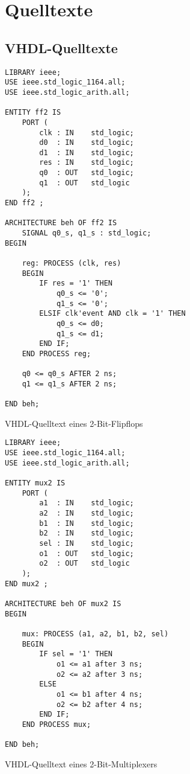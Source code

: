 \chapter{Quelltexte}

\section{VHDL-Quelltexte}\label{anhang:source:vhdl}

\begin{code}
    \begin{verbatim}
LIBRARY ieee;
USE ieee.std_logic_1164.all;
USE ieee.std_logic_arith.all;

ENTITY ff2 IS
    PORT (
        clk : IN    std_logic;
        d0  : IN    std_logic;
        d1  : IN    std_logic;
        res : IN    std_logic;
        q0  : OUT   std_logic;
        q1  : OUT   std_logic
    );
END ff2 ;

ARCHITECTURE beh OF ff2 IS
    SIGNAL q0_s, q1_s : std_logic;
BEGIN
    
    reg: PROCESS (clk, res)
    BEGIN
        IF res = '1' THEN
            q0_s <= '0';
            q1_s <= '0';
        ELSIF clk'event AND clk = '1' THEN
            q0_s <= d0;
            q1_s <= d1;
        END IF;
    END PROCESS reg;

    q0 <= q0_s AFTER 2 ns;
    q1 <= q1_s AFTER 2 ns;

END beh;
    \end{verbatim}
    \caption{VHDL-Quelltext eines 2-Bit-Flipflops \cite[siehe][39]{kesel2013}}
\end{code}

\begin{code}
    \begin{verbatim}
LIBRARY ieee;
USE ieee.std_logic_1164.all;
USE ieee.std_logic_arith.all;

ENTITY mux2 IS
    PORT (
        a1  : IN    std_logic;
        a2  : IN    std_logic;
        b1  : IN    std_logic;
        b2  : IN    std_logic;
        sel : IN    std_logic;
        o1  : OUT   std_logic;
        o2  : OUT   std_logic
    );
END mux2 ;

ARCHITECTURE beh OF mux2 IS
BEGIN

    mux: PROCESS (a1, a2, b1, b2, sel)
    BEGIN
        IF sel = '1' THEN
            o1 <= a1 after 3 ns;
            o2 <= a2 after 3 ns;
        ELSE
            o1 <= b1 after 4 ns;
            o2 <= b2 after 4 ns;
        END IF;
    END PROCESS mux;

END beh;
    \end{verbatim}
    \caption{VHDL-Quelltext eines 2-Bit-Multiplexers \cite[siehe][39--40]{kesel2013}}
\end{code}

